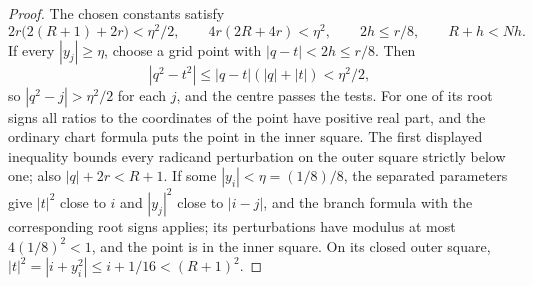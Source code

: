 \begin{proof}
The chosen constants satisfy
\[
 2r\bigl(2(R+1)+2r\bigr)<\eta^2/2,\qquad
 4r(2R+4r)<\eta^2,\qquad 2h\le r/8,\qquad R+h<Nh.
\]
If every $|y_j|\ge\eta$, choose a grid point with $|q-t|<2h\le r/8$. Then
\[
 |q^2-t^2|\le |q-t|(|q|+|t|)<\eta^2/2,
\]
so $|q^2-j|>\eta^2/2$ for each $j$, and the centre passes the tests. For one of its root signs all ratios to the coordinates of the
point have positive real part, and the ordinary chart formula puts the point in the inner square. The first displayed inequality
bounds every radicand perturbation on the outer square strictly below one; also $|q|+2r<R+1$. If some $|y_i|<\eta=(1/8)/8$, the
separated parameters give $|t|^2$ close to $i$ and $|y_j|^2$ close to $|i-j|$, and the branch formula with the corresponding root
signs applies; its perturbations have modulus at most $4(1/8)^2<1$, and the point is in the inner square. On its closed outer
square, $|t|^2=|i+y_i^2|\le i+1/16<(R+1)^2$.
\end{proof}


